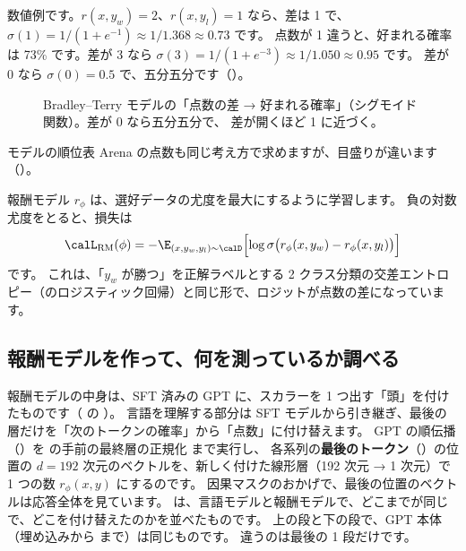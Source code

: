 数値例です。$r(x,y_w)=2$、$r(x,y_l)=1$ なら、差は 1 で、$\sigma(1)=1/(1+e^{-1})\approx1/1.368\approx0.73$ です。
点数が 1 違うと、好まれる確率は 73\% です。差が 3 なら $\sigma(3)=1/(1+e^{-3})\approx1/1.050\approx0.95$ です。
差が 0 なら $\sigma(0)=0.5$ で、五分五分です（）。

\begin{figure}[tbp]
\centering
{}
\caption{Bradley--Terry モデルの「点数の差 → 好まれる確率」（シグモイド関数）。差が 0 なら五分五分で、
差が開くほど 1 に近づく。}
\label{fig:rl-bt-sigmoid}
\end{figure}

モデルの順位表 Arena の点数も同じ考え方で求めますが、目盛りが違います（）。

報酬モデル $r_\phi$ は、選好データの尤度を最大にするように学習します。
負の対数尤度をとると、損失は
\begin{equation}
\calL_{\text{RM}}(\phi)=-\E_{(x,y_w,y_l)\sim\calD}\Bigl[\log\sigma\bigl(r_\phi(x,y_w)-r_\phi(x,y_l)\bigr)\Bigr]
\label{eq:rl-rm-loss}
\end{equation}
です。
これは、「$y_w$ が勝つ」を正解ラベルとする 2 クラス分類の交差エントロピー（のロジスティック回帰）と同じ形で、ロジットが点数の差になっています。

\subsection{報酬モデルを作って、何を測っているか調べる}

報酬モデルの中身は、SFT 済みの GPT に、スカラーを 1 つ出す「頭」を付けたものです（ の ）。
言語を理解する部分は SFT モデルから引き継ぎ、最後の層だけを「次のトークンの確率」から「点数」に付け替えます。
GPT の順伝播（）を  の手前の最終層の正規化  まで実行し、
各系列の\textbf{最後のトークン}（）の位置の $d=192$ 次元のベクトルを、新しく付けた線形層（192 次元 → 1 次元）で 1 つの数 $r_\phi(x,y)$ にするのです。
因果マスクのおかげで、最後の位置のベクトルは応答全体を見ています。
は、言語モデルと報酬モデルで、どこまでが同じで、どこを付け替えたのかを並べたものです。
上の段と下の段で、GPT 本体（埋め込みから  まで）は同じものです。
違うのは最後の 1 段だけです。

